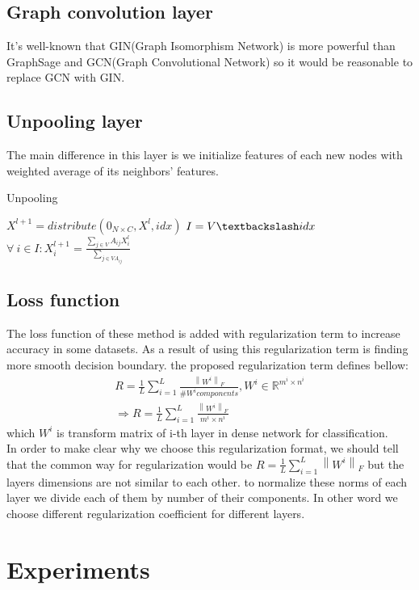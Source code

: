 \documentclass[nohyperref]{article}
\theoremstyle{plain}
\theoremstyle{definition}
\theoremstyle{remark}
\begin{document}
\subsection{Graph convolution layer}
It's well-known that GIN(Graph Isomorphism Network) is more powerful than GraphSage and GCN(Graph Convolutional Network) so it would be reasonable to replace GCN with GIN.
\subsection{Unpooling layer}
The main difference in this layer is we initialize features of each new nodes with weighted average of its neighbors' features. 
\begin{algorithm}[tb]
	\caption{Unpooling }
	\label{alg:example}
	\begin{algorithmic}
	\STATE $X^{l+1}=distribute(0_{N \times C}, X^l, idx)$
	\STATE  $I=V \textbackslash idx$
	\STATE$ \forall \: i \in I: X_i^{l+1}= \frac{\sum_{j \in V} A_{ij}X_i^{l}}{\sum_{j \in V A_{ij}}}$
	\end{algorithmic}
\end{algorithm}
\subsection{Loss function}
The loss function of these method is added with regularization term to increase accuracy in some datasets. As a result of using this regularization term is finding more smooth decision boundary. the proposed regularization term defines bellow:
\begin{gather}
	R=\frac{1}{L}\sum_{i=1}^{L}\frac{\left \|W^i\right \|_F}{\#W^icomponents}, W^i\in \mathbb{R}^{m^i\times n^i}
	\\ \Rightarrow R=\frac{1}{L}\sum_{i=1}^{L}\frac{\left \|W^i\right \|_F}{m^i\times n^i}
\end{gather}
which $W^i$ is transform matrix of i-th layer in dense network for classification.
\\In order to make clear why we choose this regularization format, we should tell that the common way for regularization would be $R=\frac{1}{L}\sum_{i=1}^{L}{\left \|W^i\right \|_F}$ but the layers dimensions are not similar to each other. to normalize these norms of each layer we divide each of them by number of their components. In other word we choose different regularization coefficient for different layers.

\section{Experiments}
\end{document}
